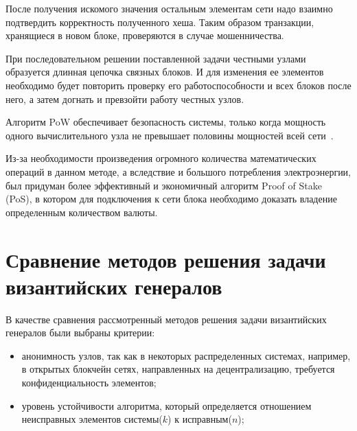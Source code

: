 После получения искомого значения остальным элементам сети надо взаимно подтвердить корректность полученного хеша. Таким образом транзакции, хранящиеся в новом блоке, проверяются в случае мошенничества. 

При последовательном решении поставленной задачи честными узлами образуется длинная цепочка связных блоков. И для изменения ее элементов необходимо будет повторить проверку его работоспособности и всех блоков после него, а затем догнать и превзойти работу честных узлов.

Алгоритм PoW обеспечивает безопасность системы, только когда мощность одного вычислительного узла не превышает половины мощностей всей сети~\cite{blockchain}.

Из-за необходимости произведения огромного количества математических операций в данном методе, а вследствие и большого потребления электроэнергии, был придуман более эффективный и экономичный алгоритм Proof of Stake (PoS), в котором для подключения к сети блока необходимо доказать владение определенным количеством валюты.
%
%
%


\section{Сравнение методов решения задачи византийских генералов}

В качестве сравнения рассмотренный методов решения задачи византийских генералов были выбраны критерии:
\begin{itemize}
	\item анонимность узлов, так как в некоторых распределенных системах, например, в открытых блокчейн сетях, направленных на децентрализацию, требуется конфиденциальность элементов;
	\item уровень устойчивости алгоритма, который определяется отношением неисправных элементов системы($k$) к исправным($n$);
\end{itemize}

